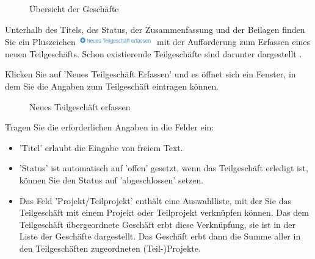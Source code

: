 \begin{figure}[H]
\caption{Übersicht der Geschäfte}
\end{figure}

Unterhalb des Titels, des Status, der Zusammenfassung und der Beilagen finden Sie ein Pluszeichen \includegraphics[height=12pt]{../chapters/06_Geschaefte/pictures/6-2_TeilgeschaeftErfassen.jpg}  mit der Aufforderung zum Erfassen eines neuen Teilgeschäfts. Schon existierende Teilgeschäfte sind darunter dargestellt .

\vspace{\baselineskip}

Klicken Sie auf 'Neues Teilgeschäft Erfassen' und es öffnet sich ein Fenster, in dem Sie die Angaben zum Teilgeschäft eintragen können.

\begin{figure}[H]
\caption{Neues Teilgeschäft erfassen}
\end{figure}

Tragen Sie die erforderlichen Angaben in die Felder ein:

\begin{itemize}
\item
'Titel'  erlaubt die Eingabe von freiem Text.
\item
'Status'  ist automatisch auf 'offen' gesetzt, wenn das Teilgeschäft erledigt ist, können Sie den Status auf 'abgeschlossen' setzen.
\item
Das Feld 'Projekt/Teilprojekt'  enthält eine Auswahlliste, mit der Sie das Teilgeschäft mit einem Projekt oder Teilprojekt verknüpfen können. Das dem Teilgeschäft übergeordnete Geschäft erbt diese Verknüpfung, sie ist in der Liste der Geschäfte dargestellt. Das Geschäft erbt dann die Summe aller in den Teilgeschäften zugeordneten (Teil-)Projekte.
\end{itemize}

